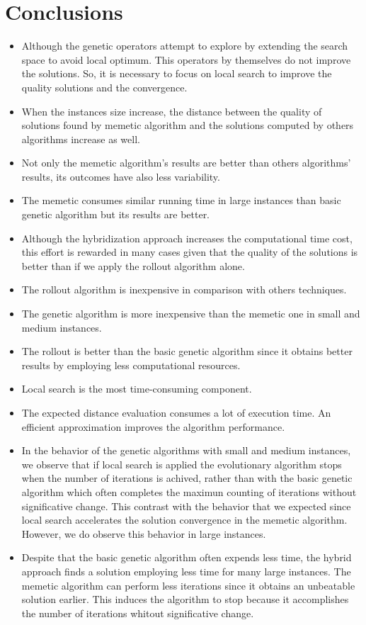 \chapter{Conclusions}
\label{chap:conclusions}


\begin{itemize}
 \item Although the genetic operators attempt to explore by extending the search space to avoid local optimum. This operators by themselves do not improve the solutions. So, it is necessary to focus on local search to improve the quality solutions and the convergence.
 \item When the instances size increase, the distance between the quality of solutions found by memetic algorithm and the solutions computed by others algorithms increase as well.
 \item Not only the memetic algorithm's results are better than others algorithms' results, its outcomes have also less variability.
 \item The memetic consumes similar running time in large instances than basic genetic algorithm but its results are better.
 \item Although the hybridization approach increases the computational time cost, this effort is rewarded in many cases given that the quality of the solutions is better than if we apply the rollout algorithm alone. 
 \item The rollout algorithm is inexpensive in comparison with others techniques.
 \item The genetic algorithm is more inexpensive than the memetic one in small and medium instances.
 \item The rollout is better than the basic genetic algorithm since it obtains better results by employing less computational resources.
 \item Local search is the most time-consuming component.
 \item The expected distance evaluation consumes a lot of execution time. An efficient approximation improves the algorithm performance.
 \item In the behavior of the genetic algorithms with small and medium instances, we observe that if local search is applied the evolutionary algorithm stops when the number of iterations is achived, rather than with the basic genetic algorithm which often completes the maximun counting of iterations without significative change. This contrast with the behavior that we expected since local search accelerates the solution convergence in the memetic algorithm. However, we do observe this behavior in large instances.
 \item Despite that the basic genetic algorithm often expends less time, the hybrid approach finds a solution employing less time for many large instances. The memetic algorithm can perform less iterations since it obtains an unbeatable solution earlier. This induces the algorithm to stop  because it accomplishes the number of iterations whitout significative change.
 
\end{itemize}




